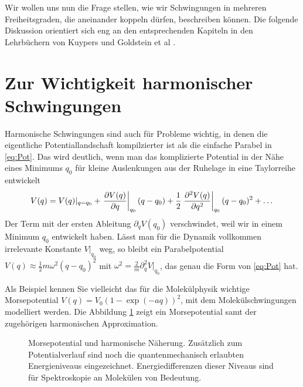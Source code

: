 \documentclass[paper=a4, fontsize=11.0pt, abstractoff, DIV12]{scrartcl}
\begin{document}
Wir wollen uns nun die Frage stellen, wie wir Schwingungen in mehreren
Freiheitsgraden, die aneinander koppeln dürfen, beschreiben können. Die
folgende Diskussion orientiert sich eng an den entsprechenden Kapiteln in den
Lehrbüchern von Kuypers \cite{Kuypers} und Goldstein et al \cite{Goldstein}.

\section{Zur Wichtigkeit harmonischer Schwingungen}

Harmonische Schwingungen sind auch für Probleme wichtig, in denen die
eigentliche Potentiallandschaft kompilzierter ist als die einfache Parabel
in \eqref{eq:Pot}. Das wird deutlich, wenn man das komplizierte Potential in
der Nähe eines Minimums $q_0$ für kleine Auslenkungen aus der Ruhelage in
eine Taylorreihe entwickelt
\begin{equation}
V(q) = V(q)\vert_{q=q_0}+ \left.\frac{\partial V(q)}{\partial q}\right|_{q_0}(q - q_0)  + \frac{1}{2}\left. \frac{\partial^2 V(q)}{\partial {q}^2} \right|_{q_0}(q - q_0)^2 + \dots
\end{equation}
Der Term mit der ersten Ableitung $\partial_q V(q_0)$ verschwindet, weil wir
in einem Minimum $q_0$ entwickelt haben. Lässt man für die Dynamik vollkommen
irrelevante Konstante $V|_{q_0}$ weg, so bleibt ein Parabelpotential
$V(q) \approx \frac{1}{2}m\omega^2 (q-q_0)^2$ mit
$\omega^2 = \frac{2}{m}\partial_q^2 V|_{q_0} $, das genau die Form von
\eqref{eq:Pot} hat.

Als Beispiel kennen Sie vielleicht das für die Molekülphysik wichtige
Morsepotential $V(q) = V_0\left(1-\exp(-aq)\right)^2$, mit dem
Molekülschwingungen modelliert werden. Die Abbildung \ref{fig:Morse} zeigt
ein Morsepotential samt der zugehörigen harmonischen Approximation.
\begin{figure}
    \centering
    
    \caption{Morsepotential und harmonische Näherung. Zusätzlich zum Potentialverlauf
    sind noch die quantenmechanisch erlaubten Energieniveaus eingezeichnet.
    Energiedifferenzen dieser Niveaus sind für Spektroskopie an Molekülen von Bedeutung.}
    \label{fig:Morse}
\end{figure}
\end{document}
